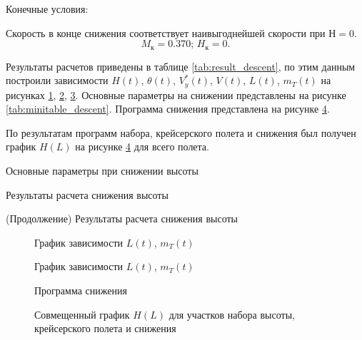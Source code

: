 Конечные условия:

Скорость в конце снижения соответствует наивыгоднейшей скорости при $Н=0$.
\[
    M_к = 0.370;\, H_к = 0.
\]

Результаты расчетов приведены в таблице \ref{tab:result_descent}, по этим
данным построили зависимости $H(t)$, $\theta(t)$, $V_y^*(t)$, $V(t)$,
$L(t)$, $m_T(t)$ на рисунках \ref{fig:param_des}, \ref{fig:L_t_des},
\ref{fig:H_M_des}. Основные параметры на снижении представлены на рисунке
\ref{tab:minitable_descent}. Программа снижения представлена на рисунке
\ref{fig:H_L}.

По результатам программ набора, крейсерского полета и снижения был получен график
$H(L)$ на рисунке \ref{fig:H_L} для всего полета.

\begin{table}[H]
    \caption{Основные параметры при снижении высоты}
    \centering
    
    \label{tab:minitable_descent}
\end{table}

\begin{sidewaystable}[ph!]
    \centering
    \caption{Результаты расчета снижения высоты}
    \label{tab:result_descent}
    
    \centering
    \addtocounter{table}{-1}
    \addtocounter{totaltables}{-1}
    \caption{(Продолжение) Результаты расчета снижения высоты}
    
\end{sidewaystable}
\newpage

\begin{figure}[H]
\centering
\resizebox{.79\linewidth}{!}{}
\caption{График зависимости $L(t)$, $m_{T}(t)$}
\label{fig:param_des}
\end{figure}

\begin{figure}[H]
\centering
\resizebox{.79\linewidth}{!}{}
\caption{График зависимости $L(t)$, $m_{T}(t)$}
\label{fig:L_t_des}
\end{figure}
 
\begin{figure}[H]
\centering
\resizebox{.79\linewidth}{!}{}
\caption{Программа снижения}
\label{fig:H_M_des}
\end{figure}

\begin{figure}[H]
\centering
\resizebox{.79\linewidth}{!}{}
\caption{Совмещенный график $H(L)$ для участков набора высоты, крейсерского полета и снижения}
\label{fig:H_L}
\end{figure}

